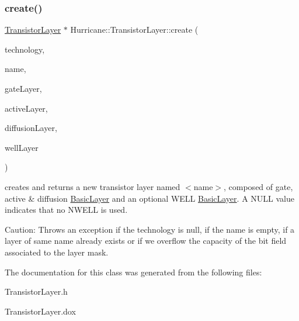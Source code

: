 \subsubsection{\texorpdfstring{create()}{create()}}
{\footnotesize\ttfamily \hyperlink{classHurricane_1_1TransistorLayer}{Transistor\+Layer} $\ast$ Hurricane\+::\+Transistor\+Layer\+::create (\begin{DoxyParamCaption}\item[{\hyperlink{classHurricane_1_1Technology}{Technology} $\ast$}]{technology,  }\item[{const \hyperlink{classHurricane_1_1Name}{Name} \&}]{name,  }\item[{\hyperlink{classHurricane_1_1BasicLayer}{Basic\+Layer} $\ast$}]{gate\+Layer,  }\item[{\hyperlink{classHurricane_1_1BasicLayer}{Basic\+Layer} $\ast$}]{active\+Layer,  }\item[{\hyperlink{classHurricane_1_1BasicLayer}{Basic\+Layer} $\ast$}]{diffusion\+Layer,  }\item[{\hyperlink{classHurricane_1_1BasicLayer}{Basic\+Layer} $\ast$}]{well\+Layer }\end{DoxyParamCaption})\hspace{0.3cm}{\ttfamily [static]}}

creates and returns a new transistor layer named {\ttfamily $<$name$>$}, composed of gate, active \& diffusion \hyperlink{classHurricane_1_1BasicLayer}{Basic\+Layer} and an optional W\+E\+LL \hyperlink{classHurricane_1_1BasicLayer}{Basic\+Layer}. A N\+U\+LL value indicates that no N\+W\+E\+LL is used.

\begin{DoxyParagraph}{Caution\+:}
Throws an exception if the technology is null, if the name is empty, if a layer of same name already exists or if we overflow the capacity of the bit field associated to the layer mask. 
\end{DoxyParagraph}


The documentation for this class was generated from the following files\+:\begin{DoxyCompactItemize}
\item 
Transistor\+Layer.\+h\item 
Transistor\+Layer.\+dox\end{DoxyCompactItemize}
